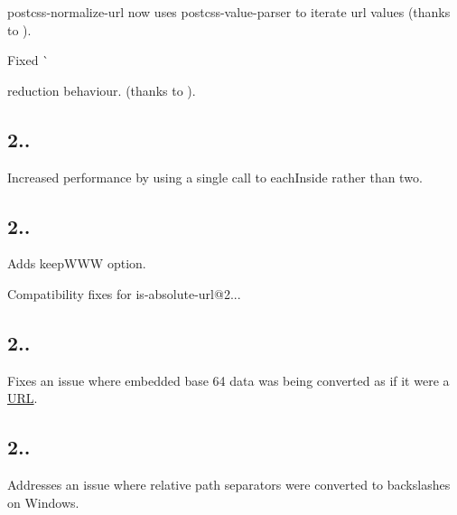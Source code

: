 \begin{DoxyItemize}
\item postcss-\/normalize-\/url now uses postcss-\/value-\/parser to iterate url values (thanks to ).
\item Fixed \`{}

reduction behaviour. (thanks to ).
\end{DoxyItemize}

\subsection*{2..}


\begin{DoxyItemize}
\item Increased performance by using a single call to {\ttfamily each\+Inside} rather than two.
\end{DoxyItemize}

\subsection*{2..}


\begin{DoxyItemize}
\item Adds {\ttfamily keep\+W\+WW} option.
\item Compatibility fixes for {\ttfamily is-\/absolute-\/url@2..}.
\end{DoxyItemize}

\subsection*{2..}


\begin{DoxyItemize}
\item Fixes an issue where embedded base 64 data was being converted as if it were a \mbox{\hyperlink{namespace_u_r_l}{U\+RL}}.
\end{DoxyItemize}

\subsection*{2..}


\begin{DoxyItemize}
\item Addresses an issue where relative path separators were converted to backslashes on Windows.
\end{DoxyItemize}

